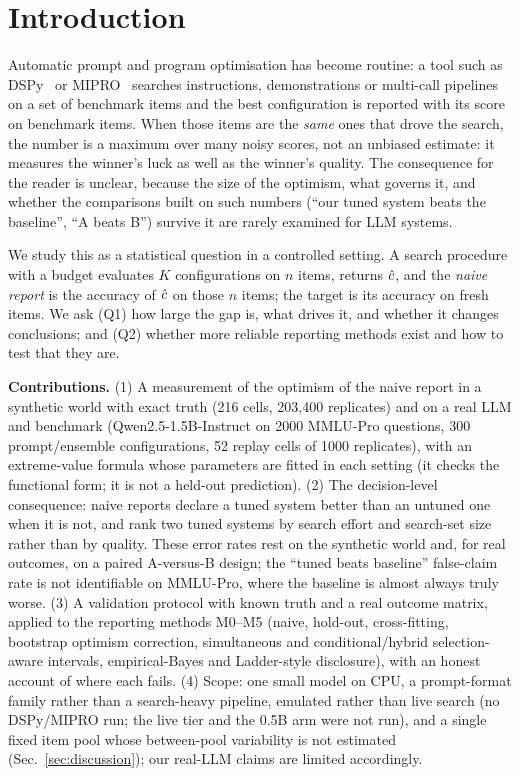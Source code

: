 \section{Introduction}
\label{sec:intro}
Automatic prompt and program optimisation has become routine: a tool such as DSPy~\citep{khattab2023dspy} or MIPRO~\citep{opsahlong2024mipro} searches instructions, demonstrations or multi-call pipelines on a set of benchmark items and the best configuration is reported with its score on benchmark items. When those items are the \emph{same} ones that drove the search, the number is a maximum over many noisy scores, not an unbiased estimate: it measures the winner's luck as well as the winner's quality. The consequence for the reader is unclear, because the size of the optimism, what governs it, and whether the comparisons built on such numbers (``our tuned system beats the baseline'', ``A beats B'') survive it are rarely examined for LLM systems.

We study this as a statistical question in a controlled setting. A search procedure with a budget evaluates $K$ configurations on $n$ items, returns $\hat c$, and the \emph{naive report} is the accuracy of $\hat c$ on those $n$ items; the target is its accuracy on fresh items. We ask (Q1) how large the gap is, what drives it, and whether it changes conclusions; and (Q2) whether more reliable reporting methods exist and how to test that they are.

\textbf{Contributions.} (1) A measurement of the optimism of the naive report in a synthetic world with exact truth (216 cells, 203{,}400 replicates) and on a real LLM and benchmark (Qwen2.5-1.5B-Instruct on 2000 MMLU-Pro questions, 300 prompt/ensemble configurations, 52 replay cells of 1000 replicates), with an extreme-value formula whose parameters are fitted in each setting (it checks the functional form; it is not a held-out prediction). (2) The decision-level consequence: naive reports declare a tuned system better than an untuned one when it is not, and rank two tuned systems by search effort and search-set size rather than by quality. These error rates rest on the synthetic world and, for real outcomes, on a paired A-versus-B design; the ``tuned beats baseline'' false-claim rate is not identifiable on MMLU-Pro, where the baseline is almost always truly worse. (3) A validation protocol with known truth and a real outcome matrix, applied to the reporting methods M0--M5 (naive, hold-out, cross-fitting, bootstrap optimism correction, simultaneous and conditional/hybrid selection-aware intervals, empirical-Bayes and Ladder-style disclosure), with an honest account of where each fails. (4) Scope: one small model on CPU, a prompt-format family rather than a search-heavy pipeline, emulated rather than live search (no DSPy/MIPRO run; the live tier and the 0.5B arm were not run), and a single fixed item pool whose between-pool variability is not estimated (Sec.~\ref{sec:discussion}); our real-LLM claims are limited accordingly.
